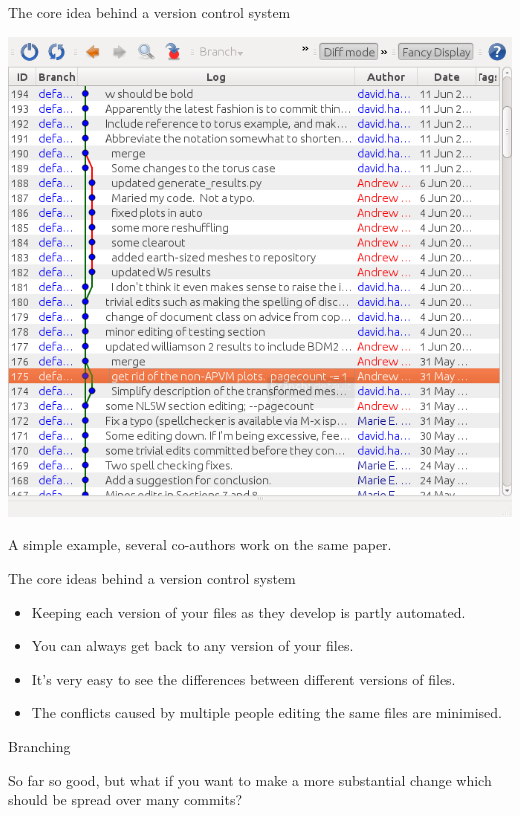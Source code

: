 \documentclass[t]{beamer}
\begin{document}
\begin{frame}{The core idea behind a version control system}

  \centering
  
  \includegraphics[height=.8\textheight]{mercurial_paper.png}

  A simple example, several co-authors work on the same paper. 
  
\end{frame}

\begin{frame}{The core ideas behind a version control system}
  
  \begin{itemize}
  \item Keeping each version of your files as they develop is partly automated.
  \item You can always get back to any version of your files.
  \item It's very easy to see the differences between different versions of files.
  \item The conflicts caused by multiple people editing the same files are minimised.
  \end{itemize}

\end{frame}



\begin{frame}{Branching}
  
  So far so good, but what if you want to make a more substantial change
  which should be spread over many commits?
  
\end{frame}
\end{document}
